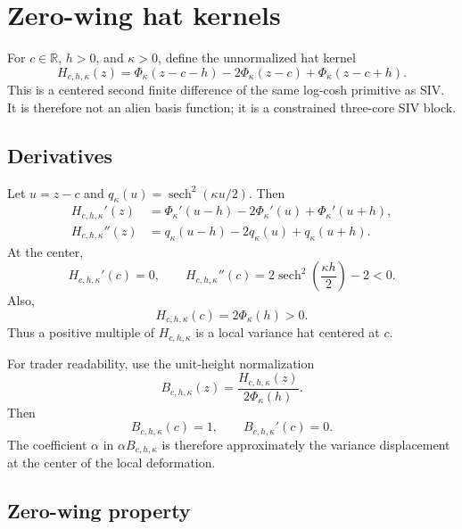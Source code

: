 \documentclass[11pt]{article}
\DeclareMathOperator{\sech}{sech}
\newcommand{\R}{\mathbb{R}}
\begin{document}
\section{Zero-wing hat kernels}
\label{sec:hats}

For $c\in\R$, $h>0$, and $\kappa>0$, define the unnormalized hat kernel
\begin{equation}
  H_{c,h,\kappa}(z)
  =\Phi_\kappa(z-c-h)-2\Phi_\kappa(z-c)+\Phi_\kappa(z-c+h).
  \label{eq:H-def}
\end{equation}
This is a centered second finite difference of the same log-cosh primitive as SIV.  It is therefore not an alien basis function; it is a constrained three-core SIV block.

\subsection{Derivatives}

Let $u=z-c$ and $q_\kappa(u)=\sech^2(\kappa u/2)$.  Then
\begin{align}
  H_{c,h,\kappa}'(z)
  &=\Phi_\kappa'(u-h)-2\Phi_\kappa'(u)+\Phi_\kappa'(u+h),
  \label{eq:H-prime}\\
  H_{c,h,\kappa}''(z)
  &=q_\kappa(u-h)-2q_\kappa(u)+q_\kappa(u+h).
  \label{eq:H-second}
\end{align}
At the center,
\begin{equation}
  H_{c,h,\kappa}'(c)=0,
  \qquad
  H_{c,h,\kappa}''(c)=2\sech^2\!\left(\frac{\kappa h}{2}\right)-2<0.
  \label{eq:H-center-curvature}
\end{equation}
Also,
\begin{equation}
  H_{c,h,\kappa}(c)=2\Phi_\kappa(h)>0.
  \label{eq:H-height}
\end{equation}
Thus a positive multiple of $H_{c,h,\kappa}$ is a local variance hat centered at $c$.

For trader readability, use the unit-height normalization
\begin{equation}
  B_{c,h,\kappa}(z)
  =\frac{H_{c,h,\kappa}(z)}{2\Phi_\kappa(h)}.
  \label{eq:B-def}
\end{equation}
Then
\begin{equation}
  B_{c,h,\kappa}(c)=1,
  \qquad
  B_{c,h,\kappa}'(c)=0.
  \label{eq:B-center}
\end{equation}
The coefficient $\alpha$ in $\alpha B_{c,h,\kappa}$ is therefore approximately the variance displacement at the center of the local deformation.

\subsection{Zero-wing property}
\end{document}
